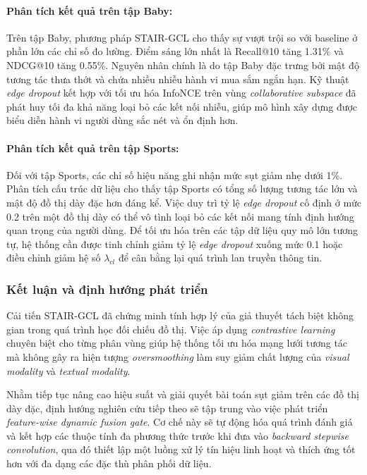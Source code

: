 \begin{longtable}
\paragraph{Phân tích kết quả trên tập Baby:}
Trên tập Baby, phương pháp STAIR-GCL cho thấy sự vượt trội so với baseline ở phần lớn các chỉ số đo lường. Điểm sáng lớn nhất là Recall@10 tăng 1.31\% và NDCG@10 tăng 0.55\%. Nguyên nhân chính là do tập Baby đặc trưng bởi mật độ tương tác thưa thớt và chứa nhiều nhiễu hành vi mua sắm ngắn hạn. Kỹ thuật \textit{edge dropout} kết hợp với tối ưu hóa InfoNCE trên vùng \textit{collaborative subspace} đã phát huy tối đa khả năng loại bỏ các kết nối nhiễu, giúp mô hình xây dựng được biểu diễn hành vi người dùng sắc nét và ổn định hơn.

\paragraph{Phân tích kết quả trên tập Sports:}
Đối với tập Sports, các chỉ số hiệu năng ghi nhận mức sụt giảm nhẹ dưới 1\%. Phân tích cấu trúc dữ liệu cho thấy tập Sports có tổng số lượng tương tác lớn và mật độ đồ thị dày đặc hơn đáng kể. Việc duy trì tỷ lệ \textit{edge dropout} cố định ở mức 0.2 trên một đồ thị dày có thể vô tình loại bỏ các kết nối mang tính định hướng quan trọng của người dùng. Để tối ưu hóa trên các tập dữ liệu quy mô lớn tương tự, hệ thống cần được tinh chỉnh giảm tỷ lệ \textit{edge dropout} xuống mức 0.1 hoặc điều chỉnh giảm hệ số $\lambda_{cl}$ để cân bằng lại quá trình lan truyền thông tin.

\subsubsection{Kết luận và định hướng phát triển}

Cải tiến STAIR-GCL đã chứng minh tính hợp lý của giả thuyết tách biệt không gian trong quá trình học đối chiếu đồ thị. Việc áp dụng \textit{contrastive learning} chuyên biệt cho từng phân vùng giúp hệ thống tối ưu hóa mạng lưới tương tác mà không gây ra hiện tượng \textit{oversmoothing} làm suy giảm chất lượng của \textit{visual modality} và \textit{textual modality}.

Nhằm tiếp tục nâng cao hiệu suất và giải quyết bài toán sụt giảm trên các đồ thị dày đặc, định hướng nghiên cứu tiếp theo sẽ tập trung vào việc phát triển \textit{feature-wise dynamic fusion gate}. Cơ chế này sẽ tự động hóa quá trình đánh giá và kết hợp các thuộc tính đa phương thức trước khi đưa vào \textit{backward stepwise convolution}, qua đó thiết lập một luồng xử lý tín hiệu linh hoạt và thích ứng tốt hơn với đa dạng các đặc thù phân phối dữ liệu.



\end{longtable}
